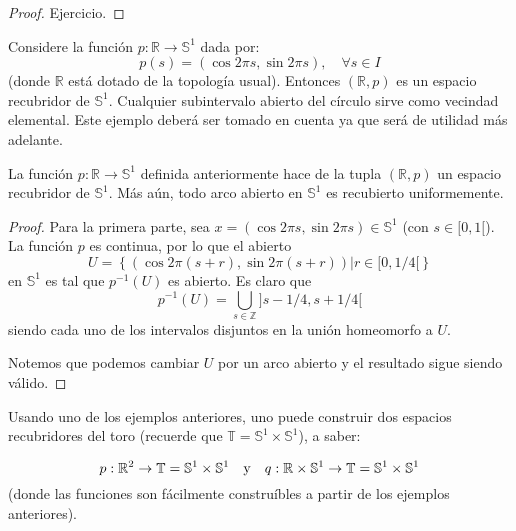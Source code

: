 \documentclass{article}
\theoremstyle{largebreak}
\newcommand\cf[3]{\ensuremath{#1:#2\rightarrow#3}}
\begin{document}
    \begin{proof}
        Ejercicio.
    \end{proof}

    \begin{exa}
        Considere la función $\cf{p}{\mathbb{R}}{\mathbb{S}^1}$ dada por:
        \begin{equation*}
            p(s)=(\cos 2\pi s,\sin 2\pi s),\quad\forall s\in I
        \end{equation*}
        (donde $\mathbb{R}$ está dotado de la topología usual). Entonces $(\mathbb{R},p)$ es un espacio recubridor de $\mathbb{S}^1$. Cualquier subintervalo abierto del círculo sirve como vecindad elemental. Este ejemplo deberá ser tomado en cuenta ya que será de utilidad más adelante.
    \end{exa}

    \begin{propo}
        La función $\cf{p}{\mathbb{R}}{\mathbb{S}^1}$ definida anteriormente hace de la tupla $(\mathbb{R},p)$ un espacio recubridor de $\mathbb{S}^1$. Más aún, todo arco abierto en $\mathbb{S}^1$ es recubierto uniformemente.
    \end{propo}

    \begin{proof}
        Para la primera parte, sea $x=(\cos2\pi s,\sin2\pi s)\in\mathbb{S}^1$ (con $s\in[0,1[$). La función $p$ es continua, por lo que el abierto
        \begin{equation*}
            U=\left\{(\cos2\pi(s+r),\sin2\pi (s+r))\Big|r\in[0,1/4[ \right\}
        \end{equation*}
        en $\mathbb{S}^1$ es tal que $p^{-1}(U)$ es abierto. Es claro que
        \begin{equation*}
            p^{-1}(U)=\bigcup_{ s\in\mathbb{Z}}]s-1/4,s+1/4[
        \end{equation*}
        siendo cada uno de los intervalos disjuntos en la unión homeomorfo a $U$.

        Notemos que podemos cambiar $U$ por un arco abierto y el resultado sigue siendo válido. 
    \end{proof}

    Usando uno de los ejemplos anteriores, uno puede construir dos espacios recubridores del toro (recuerde que $\mathbb{T}=\mathbb{S}^1\times\mathbb{S}^1$), a saber:

    \begin{equation*}
        \cf{p}{\mathbb{R}^2}{\mathbb{T}=\mathbb{S}^1\times\mathbb{S}^1}\quad\textup{y}\quad\cf{q}{\mathbb{R}\times\mathbb{S}^1}{\mathbb{T}=\mathbb{S}^1\times\mathbb{S}^1}
    \end{equation*}
    (donde las funciones son fácilmente construíbles a partir de los ejemplos anteriores).
\end{document}

